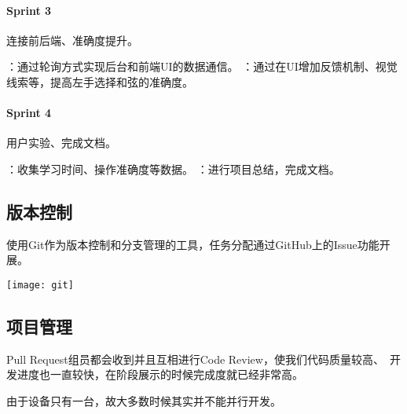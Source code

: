             \paragraph{Sprint 3} 连接前后端、准确度提升。
            \begin{enumerate}
                ：通过轮询方式实现后台和前端UI的数据通信。
                ：通过在UI增加反馈机制、视觉线索等，提高左手选择和弦的准确度。
            \end{enumerate}

            \paragraph{Sprint 4} 用户实验、完成文档。
            \begin{enumerate}
                ：收集学习时间、操作准确度等数据。
                ：进行项目总结，完成文档。
            \end{enumerate}

        \subsection{版本控制}
        使用Git作为版本控制和分支管理的工具，任务分配通过GitHub上的Issue功能开展。

        \texttt{[image: git]}

        \subsection{项目管理}
        Pull Request组员都会收到并且互相进行Code Review，使我们代码质量较高、\
        开发进度也一直较快，在阶段展示的时候完成度就已经非常高。

        由于设备只有一台，故大多数时候其实并不能并行开发。
